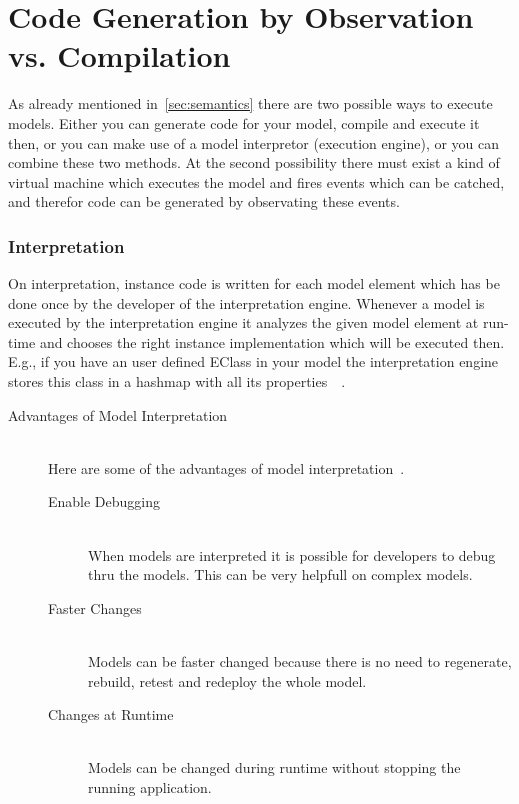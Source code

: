 \documentclass{llncs}
\begin{document}
\section{Code Generation by Observation vs. Compilation}
\label{sec:observationcompilation}
As already mentioned in~\ref{sec:semantics} there are two possible ways to execute models. Either you can generate code for your model, compile and execute it then, or you can make use of a model interpretor (execution engine), or you can combine these two methods. At the second possibility there must exist a kind of virtual machine which executes the model and fires events which can be catched, and therefor code can be generated by observating these events.

\subsubsection{Interpretation}
On interpretation, instance code is written for each model element which has be done once by the developer of the interpretation engine. Whenever a model is executed by the interpretation engine it analyzes the given model element at run-time and chooses the right instance implementation which will be executed then. E.g., if you have an user defined EClass in your model the interpretation engine stores this class in a hashmap with all its properties~\cite{misc:mdd}~\cite{jour:5}.

\begin{description}
\item [Advantages of Model Interpretation] \hfill \\
Here are some of the advantages of model interpretation~\cite{misc:mdd}.
\begin{description}
\item [Enable Debugging] \hfill \\
When models are interpreted it is possible for developers to debug thru the models. This can be very helpfull on complex models.
\item [Faster Changes] \hfill \\
Models can be faster changed because there is no need to regenerate, rebuild, retest and redeploy the whole model.
\item [Changes at Runtime] \hfill \\
Models can be changed during runtime without stopping the running application.
\end{description}

\end{description}
\end{document}
